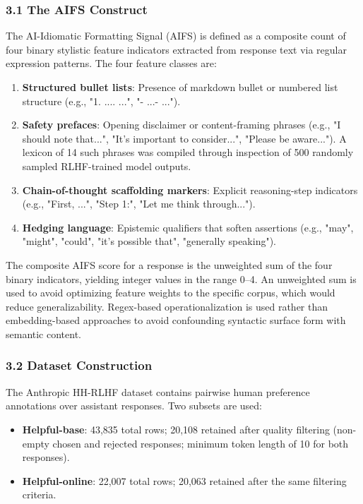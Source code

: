 
\subsubsection{3.1 The AIFS Construct}

The AI-Idiomatic Formatting Signal (AIFS) is defined as a composite count of four binary stylistic feature indicators extracted from response text via regular expression patterns. The four feature classes are:

\begin{enumerate}
\item \textbf{Structured bullet lists}: Presence of markdown bullet or numbered list structure (e.g., "1. .... ...", "- ...\n- ...").
\item \textbf{Safety prefaces}: Opening disclaimer or content-framing phrases (e.g., "I should note that...", "It's important to consider...", "Please be aware..."). A lexicon of 14 such phrases was compiled through inspection of 500 randomly sampled RLHF-trained model outputs.
\item \textbf{Chain-of-thought scaffolding markers}: Explicit reasoning-step indicators (e.g., "First, ...", "Step 1:", "Let me think through...").
\item \textbf{Hedging language}: Epistemic qualifiers that soften assertions (e.g., "may", "might", "could", "it's possible that", "generally speaking").
\end{enumerate}

The composite AIFS score for a response is the unweighted sum of the four binary indicators, yielding integer values in the range 0–4. An unweighted sum is used to avoid optimizing feature weights to the specific corpus, which would reduce generalizability. Regex-based operationalization is used rather than embedding-based approaches to avoid confounding syntactic surface form with semantic content.

\subsubsection{3.2 Dataset Construction}

The Anthropic HH-RLHF dataset \citep{Baietal2022} contains pairwise human preference annotations over assistant responses. Two subsets are used:

\begin{itemize}
\item \textbf{Helpful-base}: 43,835 total rows; 20,108 retained after quality filtering (non-empty chosen and rejected responses; minimum token length of 10 for both responses).
\item \textbf{Helpful-online}: 22,007 total rows; 20,063 retained after the same filtering criteria.
\end{itemize}

